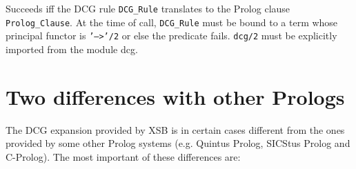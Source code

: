 \begin{description}
    Succeeds iff the DCG rule {\tt DCG\_Rule} translates to the Prolog
    clause {\tt Prolog\_Clause}.  At the time of call, {\tt DCG\_Rule}
    must be bound to a term whose principal functor is {\tt '-->'/2}
    or else the predicate fails.  {\tt dcg/2} must be explicitly
    imported from the module {\sf dcg}.

\end{description}


\section{Two differences with other Prologs}\label{sec-dcg-differences}
The DCG expansion provided by XSB is in certain cases different 
from the ones provided by some other Prolog systems (e.g.  Quintus Prolog, 
SICStus Prolog and C-Prolog). The most important of these differences are:
